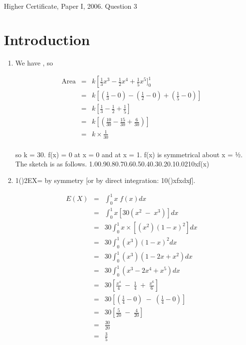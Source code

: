 \documentclass[a4paper,30pt]{article}
\begin{document}
Higher Certificate, Paper I, 2006. Question 3

\section{Introduction}
\begin{enumerate}
\item We have , so 


\begin{eqnarray*}
\mbox{Area} 
&=& k \left[ \frac{1}{3}x^3 - \frac{1}{2}x^4 + \frac{1}{5}x^5]^{1}_{0}\\
&=& k \left[  \left(\frac{1}{3} - 0\right)  -  \left(\frac{1}{2} - 0\right) +  \left(\frac{1}{5} - 0\right) \right]\\
&=& k \left[  \frac{1}{3} - \frac{1}{2} + \frac{1}{5} \right]\\
&=& k \left[  \left(\frac{10}{30} - \frac{15}{30} + \frac{6}{30}\right)\right]\\
&=& k \times \frac{1}{30} \\
\end{eqnarray*}


so k = 30.
f(x) = 0 at x = 0 and at x = 1. f(x) is symmetrical about x = ½. The sketch is as follows. 1.00.90.80.70.60.50.40.30.20.10.0210xf(x)
\item 1()2EX= by symmetry [or by direct integration: 10()xfxdx∫].

\begin{eqnarray*}
E(X) &=& \int^{1}_{0} x \;f(x) dx \\
&=& \int^{1}_{0} x[30(x^2\;-\;x^3)] dx \\
&=& 30 \int^{1}_{0} x  \times \left[(x^2)(1-x)^2\right] dx\\
&=& 30 \int^{1}_{0} (x^3)(1-x)^2 dx\\
&=& 30 \int^{1}_{0} (x^3)(1-2x + x^2) dx\\
&=& 30 \int^{1}_{0} (x^3 -2x^4 + x^5) dx\\
&=& 30 \left[ \frac{x^4}{4}  \;-\;  \frac{1}{4} \; + \; \frac{x^6}{6}  \right]\\
&=& 30 \left[ \left( \frac{1}{4}- 0 \right) \;-\; \left( \frac{1}{4}- 0 \right)  \right]\\
&=& 30 \left[  \frac{5}{20} \;-\; \frac{4}{20} \right]\\
&=&  \frac{30}{20} \\
&=&  \frac{3}{5}\\
\end{eqnarray*}


\end{enumerate}
\end{document}
